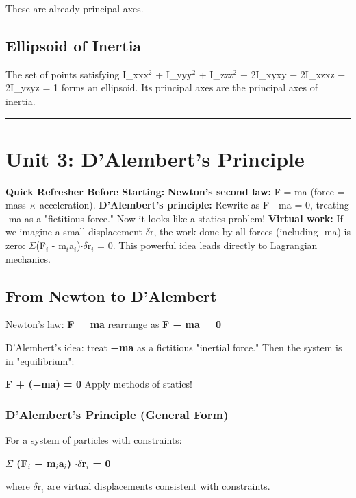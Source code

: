 \documentclass[12pt,a4paper,openany]{book}
\begin{document}
{{These are already principal axes.

\subsection{Ellipsoid of Inertia}

The set of points satisfying I_{xx}x$^2$ + I_{yy}y$^2$ + I_{zz}z$^2$ − 2I_{xy}xy − 2I_{xz}xz − 2I_{yz}yz = 1 forms an ellipsoid. Its principal axes are the principal axes of inertia.

\bigskip\noindent\rule{\textwidth}{0.4pt}\bigskip

\section{Unit 3: D'Alembert's Principle}

\begin{prereqbox}
 \textbf{Quick Refresher Before Starting:}
\textbf{Newton's second law:} F = ma (force = mass $\times$ acceleration).
\textbf{D'Alembert's principle:} Rewrite as F - ma = 0, treating -ma as a "fictitious force." Now it looks like a statics problem!
\textbf{Virtual work:} If we imagine a small displacement $\delta$r, the work done by all forces (including -ma) is zero: $\Sigma$(F$_i$ - m$_i$a$_i$)$\cdot\delta$r$_i$ = 0.
This powerful idea leads directly to Lagrangian mechanics.
\end{prereqbox}


\subsection{From Newton to D'Alembert}

Newton's law: \textbf{F = ma}  rearrange as \textbf{F − ma = 0}

D'Alembert's idea: treat \textbf{−ma} as a fictitious "inertial force." Then the system is in "equilibrium":

\textbf{F + (−ma) = 0}  Apply methods of statics!

\subsubsection{D'Alembert's Principle (General Form) }

For a system of particles with constraints:

\textbf{$\Sigma$ (F$_i$ − m$_i$a$_i$) $\cdot\delta$r$_i$ = 0}

where $\delta$r$_i$ are virtual displacements consistent with constraints.

}}
\end{document}
